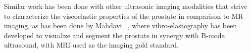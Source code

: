 Similar work has been done with other ultrasonic imaging modalities that strive
to characterize the viscoelastic properties of the prostate in comparison to MR
imaging, as has been done by Mahdavi \etal~\cite{Mahdavi2011}, where
vibro-elastography has been developed to visualize and segment the prostate in
synergy with B-mode ultrasound, with MRI used as the imaging gold standard.
